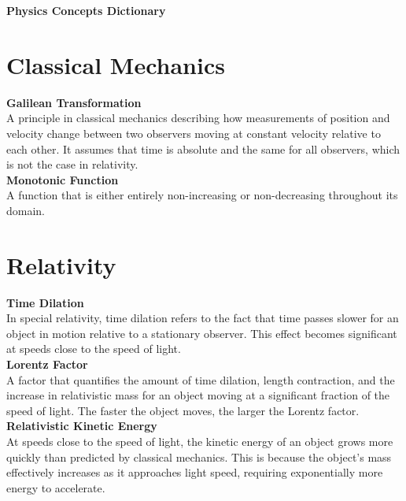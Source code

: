 \documentclass[a4paper,12pt]{article}
\begin{document}
\begin{center}
    \large\textbf{Physics Concepts Dictionary} \\[0.2cm]
\end{center}

\vspace{-0.5cm} %

\begin{footnotesize}

\begin{multicols}{3} %

\section*{Classical Mechanics}

\textbf{Galilean Transformation} \\
A principle in classical mechanics describing how measurements of position and velocity change between two observers moving at constant velocity relative to each other. It assumes that time is absolute and the same for all observers, which is not the case in relativity. \\

\textbf{Monotonic Function} \\
A function that is either entirely non-increasing or non-decreasing throughout its domain.  \\


\section*{Relativity}

\textbf{Time Dilation} \\
In special relativity, time dilation refers to the fact that time passes slower for an object in motion relative to a stationary observer. This effect becomes significant at speeds close to the speed of light. \\


\textbf{Lorentz Factor} \\
A factor that quantifies the amount of time dilation, length contraction, and the increase in relativistic mass for an object moving at a significant fraction of the speed of light. The faster the object moves, the larger the Lorentz factor. \\


\textbf{Relativistic Kinetic Energy} \\
At speeds close to the speed of light, the kinetic energy of an object grows more quickly than predicted by classical mechanics. This is because the object’s mass effectively increases as it approaches light speed, requiring exponentially more energy to accelerate. \\


\end{multicols}
\end{footnotesize}
\end{document}
